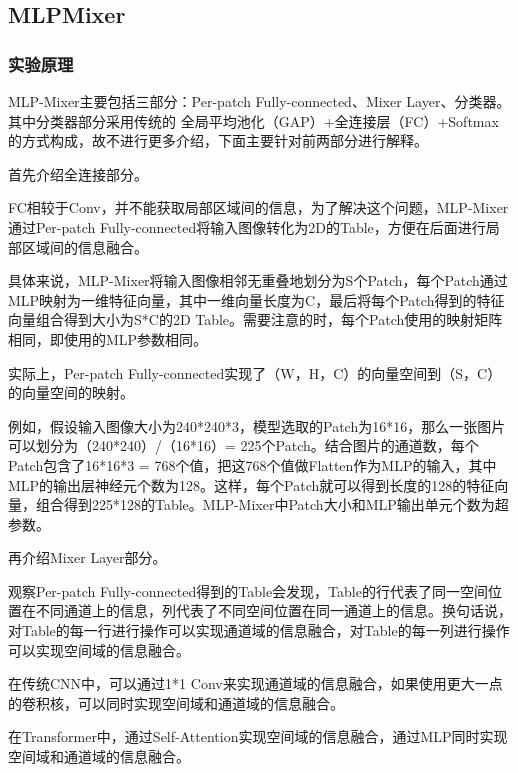 \documentclass{ctexart}
\begin{document}
\subsection{\hei MLPMixer}
\subsubsection{\hei 实验原理}
MLP-Mixer主要包括三部分：Per-patch Fully-connected、Mixer Layer、分类器。其中分类器部分采用传统的
全局平均池化（GAP）+全连接层（FC）+Softmax的方式构成，故不进行更多介绍，下面主要针对前两部分进行解释。
\par 首先介绍全连接部分。
\par FC相较于Conv，并不能获取局部区域间的信息，为了解决这个问题，MLP-Mixer通过Per-patch Fully-connected将输入图像转化为2D的Table，方便在后面进行局部区域间的信息融合。
\par 具体来说，MLP-Mixer将输入图像相邻无重叠地划分为S个Patch，每个Patch通过MLP映射为一维特征向量，其中一维向量长度为C，最后将每个Patch得到的特征向量组合得到大小为S*C的2D Table。需要注意的时，每个Patch使用的映射矩阵相同，即使用的MLP参数相同。
\par 实际上，Per-patch Fully-connected实现了（W，H，C）的向量空间到（S，C）的向量空间的映射。
\par 例如，假设输入图像大小为240*240*3，模型选取的Patch为16*16，那么一张图片可以划分为（240*240）/（16*16）= 225个Patch。结合图片的通道数，每个Patch包含了16*16*3 = 768个值，把这768个值做Flatten作为MLP的输入，其中MLP的输出层神经元个数为128。这样，每个Patch就可以得到长度的128的特征向量，组合得到225*128的Table。MLP-Mixer中Patch大小和MLP输出单元个数为超参数。
\par 再介绍Mixer Layer部分。
\par 观察Per-patch Fully-connected得到的Table会发现，Table的行代表了同一空间位置在不同通道上的信息，列代表了不同空间位置在同一通道上的信息。换句话说，对Table的每一行进行操作可以实现通道域的信息融合，对Table的每一列进行操作可以实现空间域的信息融合。
\par 在传统CNN中，可以通过1*1 Conv来实现通道域的信息融合，如果使用更大一点的卷积核，可以同时实现空间域和通道域的信息融合。

\par 在Transformer中，通过Self-Attention实现空间域的信息融合，通过MLP同时实现空间域和通道域的信息融合。
\end{document}
